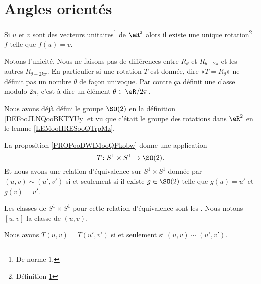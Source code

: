 \section{Angles orientés}

\begin{proposition}      \label{PROPooDWIMooQPkobw}
    Si \( u\) et \( v\) sont des vecteurs unitaires\footnote{De norme \( 1\).} de \( \eR^2\) alors il existe une unique rotation\footnote{Définition \ref{}} \( f\) telle que \( f(u)=v\).
\end{proposition}

Notons l'unicité. Nous ne faisons pas de différences entre \( R_{\theta}\) et \( R_{\theta+2\pi}\) et les autres \( R_{\theta+2k\pi}\). En particulier si une rotation \( T\) est donnée, dire «\( T=R_{\theta}\)» ne définit pas un nombre \( \theta\) de façon univoque. Par contre ça définit une classe modulo \( 2\pi\), c'est à dire un élément \( \theta\in \eR/2\pi\).

Nous avons déjà défini le groupe \( \SO(2)\) en la définition \ref{DEFooJLNQooBKTYUy} et vu que c'était le groupe des rotations dans \( \eR^2\) en le lemme \ref{LEMooHRESooQTrpMz}.

La proposition \ref{PROPooDWIMooQPkobw} donne une application
\begin{equation}
    T\colon S^1\times S^1\to \SO(2).
\end{equation}
Et nous avons une relation d'équivalence sur \( S^1\times S^1\) donnée par \( (u,v)\sim(u',v')\) si et seulement si il existe \( g\in\SO(2)\) telle que \( g(u)=u'\) et \( g(v)=v'\). 

\begin{definition}      \label{DEFooVBKIooWlHvod}
    Les classes de \( S^1\times S^1\) pour cette relation d'équivalence sont les . Nous notons \( [u,v]\) la classe de \( (u,v)\).
\end{definition}

\begin{proposition}     \label{PROPooIWJQooGQJBWR}
    Nous avons \( T(u,v)=T(u',v')\) si et seulement si \( (u,v)\sim(u',v')\).
\end{proposition}

